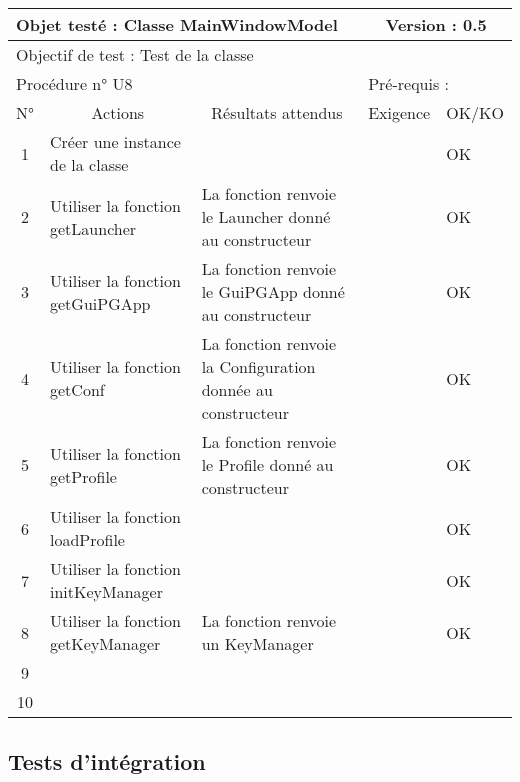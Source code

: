 \documentclass{../res/univ-projet}
\begin{document}
\begin{center}
    \begin{tabular}{|c|p{5cm}|p{5cm}|p{1.5cm}|p{1.5cm}|}
      \hline
      \multicolumn{3}{|l|}{Objet testé : Classe MainWindowModel} & \multicolumn{2}{c|}{Version : 0.5}\\ \hline
      \multicolumn{5}{|l|}{Objectif de test : Test de la classe}\\ \hline
      \multicolumn{3}{|l|}{Procédure n° U8} & \multicolumn{2}{p{3cm}|}{Pré-requis : }\\ \hline
      \multicolumn{1}{|c|}{N°} & \multicolumn{1}{c|}{Actions} & \multicolumn{1}{c|}{Résultats attendus} & 
      \multicolumn{1}{c|}{Exigence} & \multicolumn{1}{c|}{OK/KO}\\ \hline
      1 & Créer une instance de la classe &  &  & OK \\
      2 & Utiliser la fonction getLauncher & La fonction renvoie le Launcher donné au constructeur &  & OK \\
      3 & Utiliser la fonction getGuiPGApp & La fonction renvoie le GuiPGApp donné au constructeur &  & OK \\
      4 & Utiliser la fonction getConf & La fonction renvoie la Configuration donnée au constructeur &  & OK \\
      5 & Utiliser la fonction getProfile & La fonction renvoie le Profile donné au constructeur &  & OK \\
      6 & Utiliser la fonction loadProfile &  &  & OK \\
      7 & Utiliser la fonction initKeyManager &  &  & OK \\
      8 & Utiliser la fonction getKeyManager & La fonction renvoie un KeyManager &  & OK \\
      9 &  &  &  &  \\
      10 &  &  &  &  \\ 
  \hline
    \end{tabular}
    \vskip 2.2cm

\subsection{Tests d'intégration}



\end{center}
\end{document}
